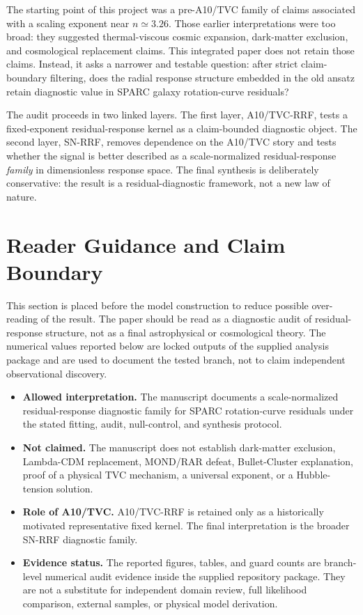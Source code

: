 \documentclass[11pt,a4paper]{article}
\begin{document}
The starting point of this project was a pre-A10/TVC family of claims associated with a scaling exponent near $n\simeq 3.26$. Those earlier interpretations were too broad: they suggested thermal-viscous cosmic expansion, dark-matter exclusion, and cosmological replacement claims. This integrated paper does not retain those claims. Instead, it asks a narrower and testable question: after strict claim-boundary filtering, does the radial response structure embedded in the old ansatz retain diagnostic value in SPARC galaxy rotation-curve residuals?

The audit proceeds in two linked layers. The first layer, A10/TVC-RRF, tests a fixed-exponent residual-response kernel as a claim-bounded diagnostic object. The second layer, SN-RRF, removes dependence on the A10/TVC story and tests whether the signal is better described as a scale-normalized residual-response \emph{family} in dimensionless response space. The final synthesis is deliberately conservative: the result is a residual-diagnostic framework, not a new law of nature.


\section{Reader Guidance and Claim Boundary}
This section is placed before the model construction to reduce possible over-reading of the result. The paper should be read as a diagnostic audit of residual-response structure, not as a final astrophysical or cosmological theory. The numerical values reported below are locked outputs of the supplied analysis package and are used to document the tested branch, not to claim independent observational discovery.

\begin{itemize}
  \item \textbf{Allowed interpretation.} The manuscript documents a scale-normalized residual-response diagnostic family for SPARC rotation-curve residuals under the stated fitting, audit, null-control, and synthesis protocol.
  \item \textbf{Not claimed.} The manuscript does not establish dark-matter exclusion, Lambda-CDM replacement, MOND/RAR defeat, Bullet-Cluster explanation, proof of a physical TVC mechanism, a universal exponent, or a Hubble-tension solution.
  \item \textbf{Role of A10/TVC.} A10/TVC-RRF is retained only as a historically motivated representative fixed kernel. The final interpretation is the broader SN-RRF diagnostic family.
  \item \textbf{Evidence status.} The reported figures, tables, and guard counts are branch-level numerical audit evidence inside the supplied repository package. They are not a substitute for independent domain review, full likelihood comparison, external samples, or physical model derivation.
\end{itemize}
\end{document}
